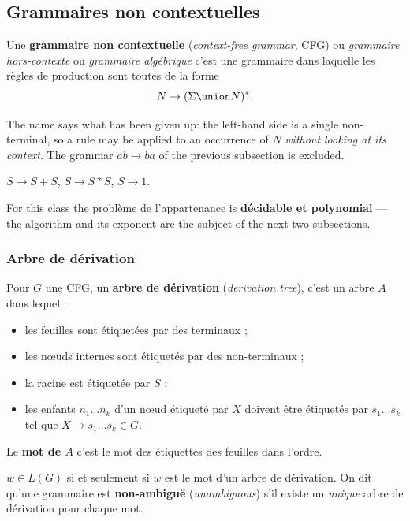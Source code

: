 \subsection{Grammaires non contextuelles}

\begin{definition}
  Une \textbf{grammaire non contextuelle} (\textit{context-free grammar}, CFG)
  ou \textit{grammaire hors-contexte} ou \textit{grammaire algébrique} c'est une
  grammaire dans laquelle les règles de production sont toutes de la forme
  \[
    N \to (\Sigma \union N)^{*} .
  \]
\end{definition}

The name says what has been given up: the left-hand side is a single
non-terminal, so a rule may be applied to an occurrence of $N$ \emph{without
looking at its context}. The grammar $ab \to ba$ of the previous subsection is
excluded.

\begin{example}
  $S \to S + S$, \quad $S \to S * S$, \quad $S \to 1$.
\end{example}

\noindent For this class the problème de l'appartenance is
\textbf{décidable et polynomial} --- the algorithm and its exponent are the
subject of the next two subsections.

\subsubsection{Arbre de dérivation}
\begin{definition}
  Pour $G$ une CFG, un \textbf{arbre de dérivation} (\textit{derivation tree}),
  c'est un arbre $A$ dans lequel :
  \begin{itemize}
    \item les feuilles sont étiquetées par des terminaux ;
    \item les nœuds internes sont étiquetés par des non-terminaux ;
    \item la racine est étiquetée par $S$ ;
    \item les enfants $n_{1} \dots n_{k}$ d'un nœud étiqueté par $X$ doivent
      être étiquetés par $s_{1} \dots s_{k}$ tel que
      $X \to s_{1} \dots s_{k} \in G$.
  \end{itemize}
  Le \textbf{mot de $A$} c'est le mot des étiquettes des feuilles dans l'ordre.
\end{definition}

\begin{remark}
  $w \in L(G)$ si et seulement si $w$ est le mot d'un arbre de dérivation. On
  dit qu'une grammaire est \textbf{non-ambiguë} (\textit{unambiguous}) s'il
  existe un \emph{unique} arbre de dérivation pour chaque mot.
\end{remark}

